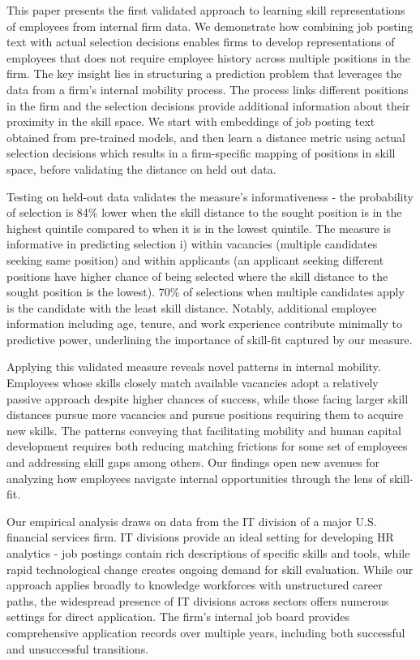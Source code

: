 \documentclass{article}
\begin{document}
This paper presents the first validated approach to learning skill representations of employees from internal firm data. We demonstrate how combining job posting text with actual selection decisions enables firms to develop representations of employees that does not require employee history across multiple positions in the firm. The key insight lies in structuring a prediction problem that leverages the data from a firm’s internal mobility process. The process links different positions in the firm and the selection decisions provide additional information about their proximity in the skill space. We start with embeddings of job posting text obtained from pre-trained models, and then learn a distance metric using actual selection decisions which results in a firm-specific mapping of positions in skill space, before validating the distance on held out data. 


Testing on held-out data validates the measure's informativeness - the probability of selection is 84\% lower when the skill distance to the sought position is in the highest quintile compared to when it is in the lowest quintile. The measure is informative in predicting selection i) within vacancies (multiple candidates seeking same position) and within applicants (an applicant seeking different positions have higher chance of being selected where the skill distance to the sought position is the lowest). 70\% of selections when multiple candidates apply is the candidate with the least skill distance. Notably, additional employee information including age, tenure, and work experience contribute minimally to predictive power, underlining the importance of skill-fit captured by our measure.


Applying this validated measure reveals novel patterns in internal mobility. Employees whose skills closely match available vacancies adopt a relatively passive approach despite higher chances of success, while those facing larger skill distances pursue more vacancies and pursue positions requiring them to acquire new skills. The patterns conveying that facilitating mobility and human capital development requires both reducing matching frictions for some set of employees and addressing skill gaps among others. Our findings open new avenues for analyzing how employees navigate internal opportunities through the lens of skill-fit.

Our empirical analysis draws on data from the IT division of a major U.S. financial services firm. IT divisions provide an ideal setting for developing HR analytics - job postings contain rich descriptions of specific skills and tools, while rapid technological change creates ongoing demand for skill evaluation. While our approach applies broadly to knowledge workforces with unstructured career paths, the widespread presence of IT divisions across sectors \parencite{Cyberstates2024} offers numerous settings for direct application. The firm's internal job board provides comprehensive application records over multiple years, including both successful and unsuccessful transitions.
\end{document}
